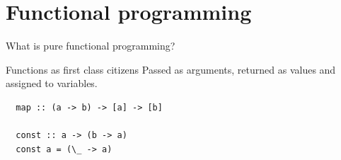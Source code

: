 \documentclass{beamer} %
\begin{document}
%
%  

\section{Functional programming}
\begin{frame}[fragile]{What is pure functional programming?}
  \begin{block}{Functions as first class citizens}
  	Passed as arguments, returned as values and assigned to variables.
  \end{block}
  
  \begin{block}{}
  \begin{verbatim}
  map :: (a -> b) -> [a] -> [b]
	
  const :: a -> (b -> a)
  const a = (\_ -> a)
  \end{verbatim}
  \end{block}
\end{frame}
 
\end{document}
